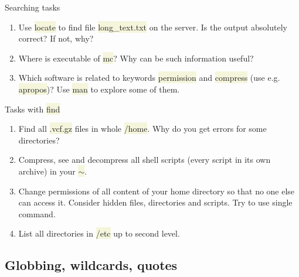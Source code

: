 \documentclass[compress, xelatex, 11pt, xcolor=svgnames, aspectratio=169, url={hyphens, lowtilde}]{beamer}
\renewcommand{\texttt}[1]{\colorbox{Beige}{{\ttfamily #1}}}
\begin{document}
\begin{frame}{Searching tasks}
	\begin{enumerate}
		\item Use \texttt{locate} to find file \texttt{long\_text.txt} on the server. Is the output absolutely correct? If not, why?
		\item Where is executable of \texttt{mc}? Why can be such information useful?
		\item Which software is related to keywords \texttt{permission} and \texttt{compress} (use e.g. \texttt{apropos})? Use \texttt{man} to explore some of them.
	\end{enumerate}
	\begin{block}{Tasks with \texttt{find}}
		\begin{enumerate}
			\item Find all \texttt{*.vcf.gz} files in whole \texttt{/home}. Why do you get errors for some directories?
			\item Compress, see and decompress all shell scripts (every script in its own archive) in your \texttt{$\sim$}.
			\item Change permissions of all content of your home directory so that no one else can access it. Consider hidden files, directories and scripts. Try to use single command.
			\item List all directories in \texttt{/etc} up to second level.
		\end{enumerate}
	\end{block}
\end{frame}

\subsection{Globbing, wildcards, quotes}
\end{document}
